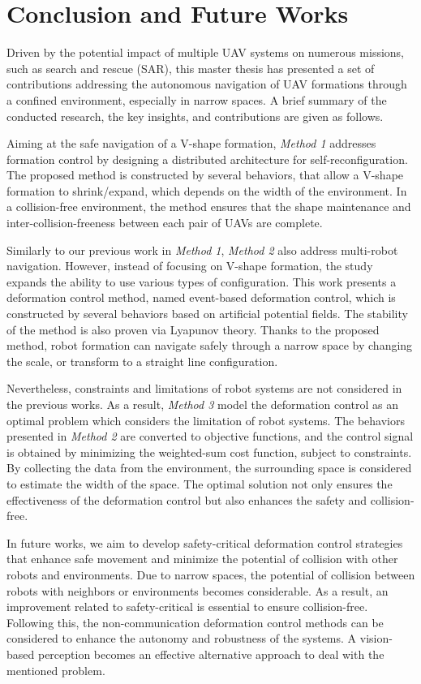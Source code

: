 \chapter{Conclusion and Future Works}

Driven by the potential impact of multiple UAV systems on numerous missions, such as search and rescue (SAR), this master thesis has presented a set of contributions addressing the autonomous navigation of UAV formations through a confined environment, especially in narrow spaces. A brief summary of the conducted research, the key insights, and contributions are given as follows.

Aiming at the safe navigation of a V-shape formation, \textit{Method 1} addresses formation control by designing a distributed architecture for self-reconfiguration. The proposed method is constructed by several behaviors, that allow a V-shape formation to shrink/expand, which depends on the width of the environment. In a collision-free environment, the method ensures that the shape maintenance and inter-collision-freeness between each pair of UAVs are complete. 

Similarly to our previous work in \textit{Method 1}, \textit{Method 2} also address multi-robot navigation. However, instead of focusing on V-shape formation, the study expands the ability to use various types of configuration. This work presents a deformation control method, named event-based deformation control, which is constructed by several behaviors based on artificial potential fields. The stability of the method is also proven via Lyapunov theory. Thanks to the proposed method, robot formation can navigate safely through a narrow space by changing the scale, or transform to a straight line configuration.

Nevertheless, constraints and limitations of robot systems are not considered in the previous works. As a result, \textit{Method 3} model the deformation control as an optimal problem which considers the limitation of robot systems. The behaviors presented in \textit{Method 2} are converted to objective functions, and the control signal is obtained by minimizing the weighted-sum cost function, subject to constraints. By collecting the data from the environment, the surrounding space is considered to estimate the width of the space. The optimal solution not only ensures the effectiveness of the deformation control but also enhances the safety and collision-free.

In future works, we aim to develop safety-critical deformation control strategies that enhance safe movement and minimize the potential of collision with other robots and environments. Due to narrow spaces, the potential of collision between robots with neighbors or environments becomes considerable. As a result, an improvement related to safety-critical is essential to ensure collision-free. Following this, the non-communication deformation control methods can be considered to enhance the autonomy and robustness of the systems. A vision-based perception becomes an effective alternative approach to deal with the mentioned problem.